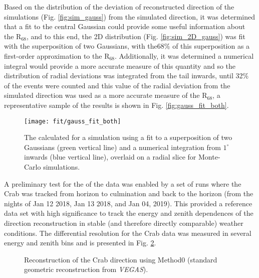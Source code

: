 \documentclass[main.tex]{subfiles}
\begin{document}
Based on the distribution of the deviation of reconstructed direction of the simulations (Fig. \ref{fig:sim_gauss}) from the simulated direction, it was determined that a fit to the central Gaussian could provide some useful information about the R$_{68}$, and to this end, the 2D distribution (Fig. \ref{fig:sim_2D_gauss}) was fit with the superposition of two Gaussians, with the68\% of this superposition as a first-order approximation to the R$_{68}$. Additionally, it was determined a numerical integral would provide a more accurate measure of this quantity and so the distribution of radial deviations was integrated from the tail inwards, until 32\% of the events were counted and this value of the radial deviation from the simulated direction was used as a more accurate measure of the R$_{68}$, a representative sample of the results is shown in Fig. \ref{fig:gauss_fit_both}.
\begin{figure}[htbp]
  \centering
  \texttt{[image: fit/gauss\_fit\_both]}
  \caption[\rse from the Gaussian fit and the numerical integral.]{The \rse calculated for a simulation using a fit to a superposition of two Gaussians (green vertical line) and a numerical integration from $1^\circ$ inwards (blue vertical line), overlaid on a radial slice for Monte-Carlo simulations.}
  \label{fig:weights}
\end{figure}

A preliminary test for the \rse of the data was enabled by a set of runs where the Crab was tracked from horizon to culmination and back to the horizon (from the nights of Jan 12 2018, Jan 13 2018, and Jan 04, 2019). This provided a reference data set with high significance to track the energy and zenith dependences of the direction reconstruction in stable (and therefore directly comparable) weather conditions. The differential resolution for the Crab data was measured in several energy and zenith bins and is presented in Fig. \ref{fig:crab_initial}.

\begin{figure}[H]
  \begin{center}
  \end{center}
  \caption[Crab direction reconstruction using Method0.]{Reconstruction of the Crab direction using Method0 (standard geometric reconstruction from \textit{VEGAS}).}
  \label{fig:crab_initial}
\end{figure}
\end{document}
